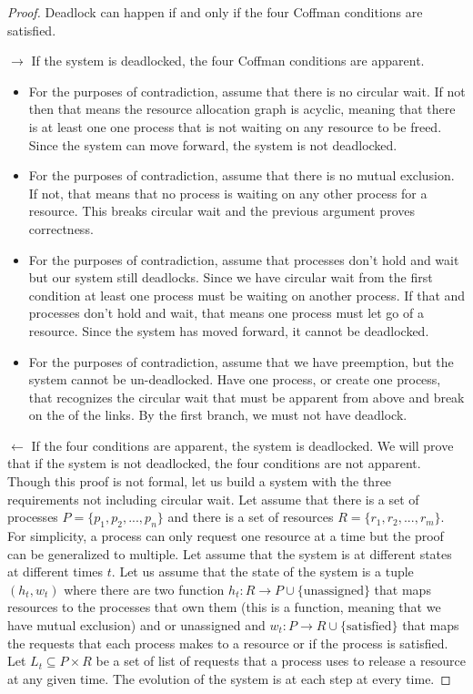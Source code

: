 \begin{proof} Deadlock can happen if and only if the four Coffman conditions are satisfied.

$\rightarrow$ If the system is deadlocked, the four Coffman conditions are apparent.

\begin{itemize}
\item For the purposes of contradiction, assume that there is no circular wait. If not then that means the resource allocation graph is acyclic, meaning that there is at least one one process that is not waiting on any resource to be freed. Since the system can move forward, the system is not deadlocked.
\item For the purposes of contradiction, assume that there is no mutual exclusion. If not, that means that no process is waiting on any other process for a resource. This breaks circular wait and the previous argument proves correctness.
\item For the purposes of contradiction, assume that processes don't hold and wait but our system still deadlocks. Since we have circular wait from the first condition at least one process must be waiting on another process. If that and processes don't hold and wait, that means one process must let go of a resource. Since the system has moved forward, it cannot be deadlocked.
\item For the purposes of contradiction, assume that we have preemption, but the system cannot be un-deadlocked. Have one process, or create one process, that recognizes the circular wait that must be apparent from above and break on the of the links. By the first branch, we must not have deadlock.
\end{itemize}

$\leftarrow$ If the four conditions are apparent, the system is deadlocked.
We will prove that if the system is not deadlocked, the four conditions are not apparent.
Though this proof is not formal, let us build a system with the three requirements not including circular wait.
Let assume that there is a set of processes $P = \{p_1, p_2, ..., p_n\}$ and there is a set of resources $R = \{r_1, r_2, ..., r_m\}$.
For simplicity, a process can only request one resource at a time but the proof can be generalized to multiple.
Let assume that the system is at different states at different times $t$.
Let us assume that the state of the system is a tuple $(h_t, w_t)$ where there are two function $h_t: R \rightarrow P \cup \{\text{unassigned}\}$ that maps resources to the processes that own them (this is a function, meaning that we have mutual exclusion) and or unassigned and $w_t: P \rightarrow R \cup \{\text{satisfied}\}$ that maps the requests that each process makes to a resource or if the process is satisfied.
Let $L_t \subseteq P \times R$ be a set of list of requests that a process uses to release a resource at any given time.
The evolution of the system is at each step at every time.


\end{proof}

